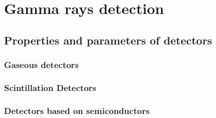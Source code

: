 
\chapter{Gamma rays detection}


\section{Properties and parameters of detectors}
\subsection{Gaseous detectors}

\subsection{Scintillation Detectors}

\subsection{Detectors based on semiconductors}





